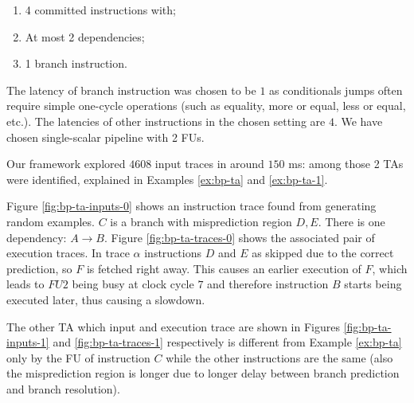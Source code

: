 \begin{enumerate}
    \item 4 committed instructions with;
    \item At most 2 dependencies;
    \item 1 branch instruction.
\end{enumerate}

The latency of branch instruction was chosen to be $1$ as conditionals jumps often require simple one-cycle operations (such as equality, more or equal, less or equal, etc.). The latencies of other instructions in the chosen setting are $4$. We have chosen single-scalar pipeline with 2 FUs.

Our framework explored $4608$ input traces in around $150$ ms: among those 2 TAs were identified, explained in Examples \ref{ex:bp-ta} and \ref{ex:bp-ta-1}.

\begin{example}
Figure \ref{fig:bp-ta-inputs-0} shows an instruction trace found from generating random examples. $C$ is a branch with misprediction region ${D, E}$. There is one dependency: $A \rightarrow B$. Figure \ref{fig:bp-ta-traces-0} shows the associated pair of execution traces. In trace $\alpha$ instructions $D$ and $E$ as skipped due to the correct prediction, so $F$ is fetched right away. This causes an earlier execution of $F$, which leads to $FU2$ being busy at clock cycle $7$ and therefore instruction $B$ starts being executed later, thus causing a slowdown.

\label{ex:bp-ta}
\end{example}

\begin{example}
The other TA which input and execution trace are shown in Figures \ref{fig:bp-ta-inputs-1} and \ref{fig:bp-ta-traces-1} respectively is different from Example \ref{ex:bp-ta} only by the FU of instruction $C$ while the other instructions are the same (also the misprediction region is longer due to longer delay between branch prediction and branch resolution).
\label{ex:bp-ta-1}
\end{example}



